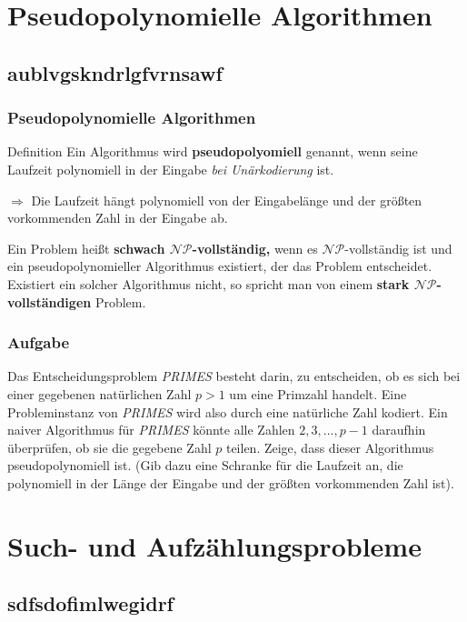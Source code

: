 \section{Pseudopolynomielle Algorithmen}
\subsection{aublvgskndrlgfvrnsawf}
\begin{frame}
\frametitle{Pseudopolynomielle Algorithmen}
\begin{block}{Definition}
Ein Algorithmus wird \textbf{pseudopolyomiell} genannt, wenn seine Laufzeit polynomiell in der Eingabe \textit{bei Unärkodierung} ist.
\end{block}

$\Rightarrow$ Die Laufzeit hängt polynomiell von der Eingabelänge und der größten vorkommenden Zahl in der Eingabe ab. \micropause

Ein Problem heißt \textbf{schwach $\mathcal{NP}$-vollständig,} wenn es $\mathcal{NP}$-vollständig ist und ein pseudopolynomieller Algorithmus existiert, der das Problem entscheidet.\micropause
Existiert ein solcher Algorithmus nicht, so spricht man von einem \textbf{stark $\mathcal{NP}$-vollständigen} Problem.
\end{frame}

\begin{frame}
\frametitle{Aufgabe}
Das Entscheidungsproblem \textit{PRIMES} besteht darin, zu entscheiden, ob es sich bei einer gegebenen natürlichen Zahl $p>1$ um eine Primzahl handelt. 
Eine Probleminstanz von \textit{PRIMES} wird also durch eine natürliche Zahl kodiert.  \micropause
Ein naiver Algorithmus für \textit{PRIMES} könnte alle Zahlen $2,3,\ldots,p-1$ daraufhin überprüfen, ob sie die gegebene Zahl $p$ teilen.  \micropause
Zeige, dass dieser Algorithmus pseudopolynomiell ist. 
(Gib dazu eine Schranke für die Laufzeit an, die polynomiell in der Länge der Eingabe und der größten vorkommenden Zahl ist).
\end{frame}

\section{Such- und Aufzählungsprobleme}
\subsection{sdfsdofimlwegidrf}
